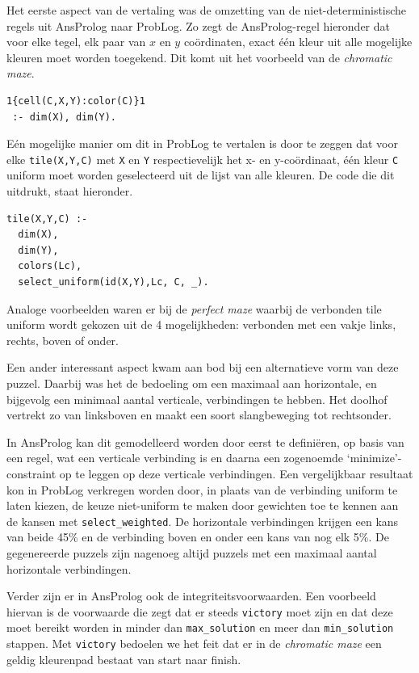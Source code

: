 \documentclass{article}
\begin{document}
Het eerste aspect van de vertaling was de omzetting van de niet-deterministische regels uit AnsProlog naar ProbLog. Zo zegt de AnsProlog-regel hieronder dat voor elke tegel, elk paar van $x$ en $y$ co\"ordinaten, exact \'e\'en kleur uit alle mogelijke kleuren moet worden toegekend. Dit komt uit het voorbeeld van de \textit{chromatic maze}.
	 
\begin{lstlisting}[language=Prolog-pretty]
1{cell(C,X,Y):color(C)}1 
 :- dim(X), dim(Y).
\end{lstlisting}

E\'en mogelijke manier om dit in ProbLog te vertalen is door te zeggen dat voor elke \texttt{tile(X,Y,C)} met \texttt{X} en \texttt{Y} respectievelijk het x- en y-co\"ordinaat, \'e\'en kleur \texttt{C} uniform moet worden geselecteerd uit de lijst van alle kleuren. De code die dit uitdrukt, staat hieronder.
\begin{lstlisting}[language=Prolog-pretty]
tile(X,Y,C) :-
  dim(X),
  dim(Y),
  colors(Lc),
  select_uniform(id(X,Y),Lc, C, _).
\end{lstlisting}

Analoge voorbeelden waren er bij de \textit{perfect maze} waarbij de verbonden tile uniform wordt gekozen uit de 4 mogelijkheden: verbonden met een vakje links, rechts, boven of onder. 

Een ander interessant aspect kwam aan bod bij een alternatieve vorm van deze puzzel. Daarbij was het de bedoeling om een maximaal aan horizontale, en bijgevolg een minimaal aantal verticale, verbindingen te hebben. Het doolhof vertrekt zo van linksboven en maakt een soort slangbeweging tot rechtsonder. 

In AnsProlog kan dit gemodelleerd worden door eerst te defini\"eren, op basis van een regel, wat een verticale verbinding is en daarna een zogenoemde `minimize'-constraint op te leggen op deze verticale verbindingen. Een vergelijkbaar resultaat kon in ProbLog verkregen worden door, in plaats van de verbinding uniform te laten kiezen, de keuze niet-uniform te maken door gewichten toe te kennen aan de kansen met \texttt{select\_weighted}. De horizontale verbindingen krijgen een kans van beide 45\% en de verbinding boven en onder een kans van nog elk 5\%. De gegenereerde puzzels zijn nagenoeg altijd puzzels met een maximaal aantal horizontale verbindingen.

Verder zijn er in AnsProlog ook de integriteitsvoorwaarden. Een voorbeeld hiervan is de voorwaarde die zegt dat er steeds \texttt{victory} moet zijn en dat deze moet bereikt worden in minder dan \texttt{max\_solution} en meer dan \texttt{min\_solution} stappen. Met \texttt{victory} bedoelen we het feit dat er in de \textit{chromatic maze} een geldig kleurenpad bestaat van start naar finish.
\end{document}
